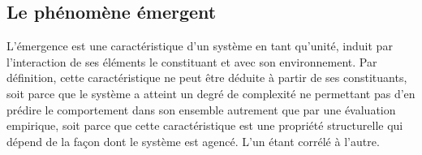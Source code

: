 \documentclass{article}
\begin{document}
%
%
%

\subsection{Le phénomène émergent}
 
 L'émergence est une caractéristique d'un système en tant qu'unité, induit par l'interaction de ses éléments le constituant et avec son environnement. Par définition, cette caractéristique ne peut être déduite à partir de ses constituants, soit parce que le système a atteint un degré de complexité ne permettant pas d'en prédire le comportement dans son ensemble autrement que par une évaluation empirique, soit parce que cette caractéristique est une propriété structurelle qui dépend de la façon dont le système est agencé. 
 L'un étant corrélé à l'autre.
%  
%
%
%

\end{document}
